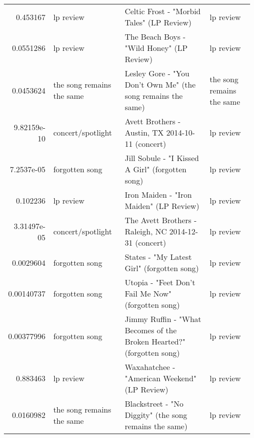 \documentclass[letterpaper,10pt]{article}
\begin{document}
\begin{table}[H]
\begin{adjustbox}{max width=\linewidth}
\begin{tabular}{rlll}
  0.453167    & lp review                 & Celtic Frost - "Morbid Tales" (LP Review)                                                                    & lp review                 \\
  0.0551286   & lp review                 & The Beach Boys - "Wild Honey" (LP Review)                                                                    & lp review                 \\
  0.0453624   & the song remains the same & Lesley Gore - "You Don't Own Me" (the song remains the same)                                                 & the song remains the same \\
  9.82159e-10 & concert/spotlight         & Avett Brothers - Austin, TX 2014-10-11 (concert)                                                             & lp review                 \\
 7.2537e-05  & forgotten song            & Jill Sobule - "I Kissed A Girl" (forgotten song)                                                            & lp review                 \\
  0.102236    & lp review                 & Iron Maiden - "Iron Maiden" (LP Review)                                                                      & lp review                 \\
  3.31497e-05 & concert/spotlight         & The Avett Brothers - Raleigh, NC 2014-12-31 (concert)                                                        & lp review                 \\
  0.0029604   & forgotten song            & States - "My Latest Girl" (forgotten song)                                                                   & lp review                 \\
  0.00140737  & forgotten song            & Utopia - "Feet Don't Fail Me Now" (forgotten song)                                                           & lp review                 \\
  0.00377996  & forgotten song            & Jimmy Ruffin - "What Becomes of the Broken Hearted?" (forgotten song)                                        & lp review                 \\
  0.883463    & lp review                 & Waxahatchee - "American Weekend" (LP Review)                                                                 & lp review                 \\
  0.0160982   & the song remains the same & Blackstreet - "No Diggity" (the song remains the same)                                                       & lp review                 \\

\end{tabular}
\end{adjustbox}
\end{table}
\end{document}
